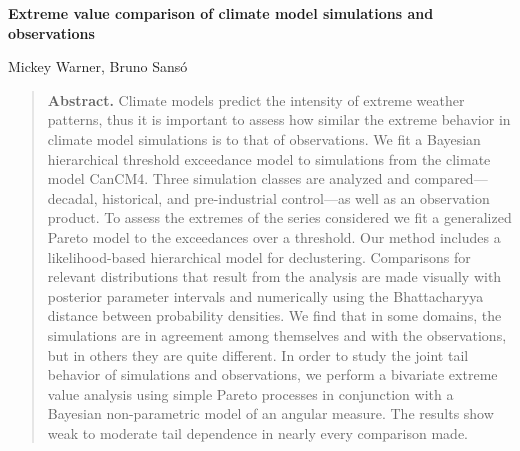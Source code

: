 \begin{Large}
\noindent \textbf{Extreme value comparison of climate model simulations and observations}
\end{Large}
\bigskip

\noindent Mickey Warner, Bruno Sans{\'o}


\bigskip
\bigskip
\begin{quote}
\textbf{Abstract.}
Climate models predict the intensity of extreme weather patterns, thus it is important to assess how similar the extreme behavior in climate model simulations is to that of observations.
We fit a Bayesian hierarchical threshold exceedance model to simulations from the climate model CanCM4.
Three simulation classes are analyzed and compared---decadal, historical, and pre-industrial control---as well as an observation product. 
To assess the extremes of the series considered we fit a generalized Pareto model to the exceedances over a threshold.
Our method includes a likelihood-based hierarchical model for declustering.
Comparisons for relevant distributions that result from the analysis are made visually with posterior parameter intervals and numerically using the Bhattacharyya distance between probability densities.
We find that in some domains, the simulations are in agreement among themselves and with the observations, but in others they are quite different.
In order to study the joint tail behavior of simulations and observations, we perform a bivariate extreme value analysis using simple Pareto processes in conjunction with a Bayesian non-parametric model of an angular measure.
The results show weak to moderate tail dependence in nearly every comparison made.
\end{quote}


